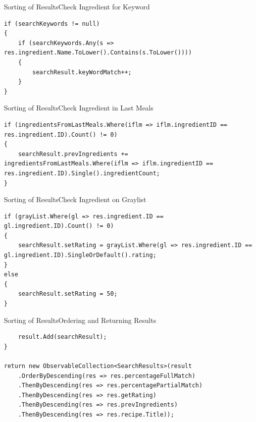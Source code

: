 \begin{frame}[fragile]{Sorting of Results}{Check Ingredient for Keyword}
\begin{lstlisting}
if (searchKeywords != null)
{
    if (searchKeywords.Any(s => res.ingredient.Name.ToLower().Contains(s.ToLower())))
    {
        searchResult.keyWordMatch++;
    }
}
\end{lstlisting}
\end{frame}

\begin{frame}[fragile]{Sorting of Results}{Check Ingredient in Last Meals}
\begin{lstlisting}
if (ingredientsFromLastMeals.Where(iflm => iflm.ingredientID == res.ingredient.ID).Count() != 0)
{
    searchResult.prevIngredients += ingredientsFromLastMeals.Where(iflm => iflm.ingredientID == res.ingredient.ID).Single().ingredientCount;
}
\end{lstlisting}
\end{frame}

\begin{frame}[fragile]{Sorting of Results}{Check Ingredient on Graylist}
\begin{lstlisting}
if (grayList.Where(gl => res.ingredient.ID == gl.ingredient.ID).Count() != 0)
{
    searchResult.setRating = grayList.Where(gl => res.ingredient.ID == gl.ingredient.ID).SingleOrDefault().rating;
}
else
{
    searchResult.setRating = 50;
}
\end{lstlisting}
\end{frame}

\begin{frame}[fragile]{Sorting of Results}{Ordering and Returning Results}
\begin{lstlisting}
    result.Add(searchResult);
}

return new ObservableCollection<SearchResults>(result
    .OrderByDescending(res => res.percentageFullMatch)
    .ThenByDescending(res => res.percentagePartialMatch)
    .ThenByDescending(res => res.getRating)
    .ThenByDescending(res => res.prevIngredients)
    .ThenByDescending(res => res.recipe.Title));
\end{lstlisting}
\end{frame}




















